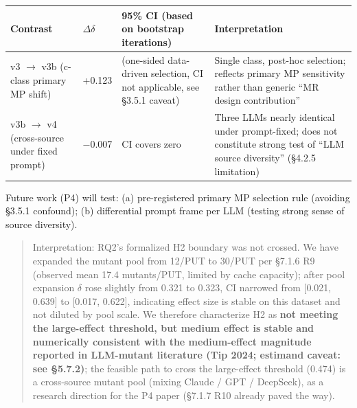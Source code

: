 \documentclass[review,12pt,authoryear]{elsarticle}
\begin{document}
{\def\LTcaptype{none} %
\begin{longtable}[]{@{}
  >{\raggedright\arraybackslash}p{}
  >{\raggedright\arraybackslash}p{}
  >{\raggedright\arraybackslash}p{}
  >{\raggedright\arraybackslash}p{}@{}}
\toprule\noalign{}
\begin{minipage}[b]{\linewidth}\raggedright
Contrast
\end{minipage} & \begin{minipage}[b]{\linewidth}\raggedright
$\Delta$$\delta$
\end{minipage} & \begin{minipage}[b]{\linewidth}\raggedright
95\% CI (based on bootstrap iterations)
\end{minipage} & \begin{minipage}[b]{\linewidth}\raggedright
Interpretation
\end{minipage} \\
\midrule\noalign{}
\endhead
\bottomrule\noalign{}
\endlastfoot
v3 $\to$ v3b (c-class primary MP shift) & +0.123 & (one-sided data-driven
selection, CI not applicable, see §3.5.1 caveat) & Single class,
post-hoc selection; reflects primary MP sensitivity rather than generic
``MR design contribution'' \\
v3b $\to$ v4 (cross-source under fixed prompt) & −0.007 & CI covers zero &
Three LLMs nearly identical under prompt-fixed; does not constitute
strong test of ``LLM source diversity'' (§4.2.5 limitation) \\
\end{longtable}
}

Future work (P4) will test: (a) pre-registered primary MP selection rule
(avoiding §3.5.1 confound); (b) differential prompt frame per LLM
(testing strong sense of source diversity).

\begin{quote}
Interpretation: RQ2's formalized H2 boundary was not crossed. We have
expanded the mutant pool from 12/PUT to 30/PUT per §7.1.6 R9 (observed
mean 17.4 mutants/PUT, limited by cache capacity); after pool expansion
$\delta$ rose slightly from 0.321 to 0.323, CI narrowed from {[}0.021, 0.639{]}
to {[}0.017, 0.622{]}, indicating effect size is stable on this dataset
and not diluted by pool scale. We therefore characterize H2 as
\textbf{not meeting the large-effect threshold, but medium effect is
stable and numerically consistent with the medium-effect magnitude
reported in LLM-mutant literature (Tip 2024; estimand caveat: see
§5.7.2)}; the feasible path to cross the large-effect threshold (0.474)
is a cross-source mutant pool (mixing Claude / GPT / DeepSeek), as a
research direction for the P4 paper (§7.1.7 R10 already paved the way).
\end{quote}
\end{document}
